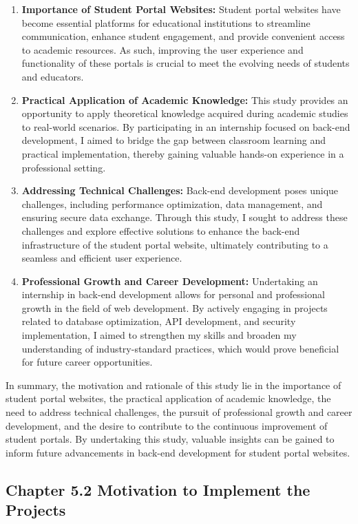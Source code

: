 \documentclass[12pt]{article}
\begin{document}
\begin{enumerate}
\item \textbf{Importance of Student Portal Websites: }Student portal websites have become essential platforms for educational institutions to streamline communication, enhance student engagement, and provide convenient access to academic resources. As such, improving the user experience and functionality of these portals is crucial to meet the evolving needs of students and educators.
\item \textbf{Practical Application of Academic Knowledge: }This study provides an opportunity to apply theoretical knowledge acquired during academic studies to real-world scenarios. By participating in an internship focused on back-end development, I aimed to bridge the gap between classroom learning and practical implementation, thereby gaining valuable hands-on experience in a professional setting.
\item \textbf{Addressing Technical Challenges: } Back-end development poses unique challenges, including performance optimization, data management, and ensuring secure data exchange. Through this study, I sought to address these challenges and explore effective solutions to enhance the back-end infrastructure of the student portal website, ultimately contributing to a seamless and efficient user experience.
\item \textbf{Professional Growth and Career Development: }Undertaking an internship in back-end development allows for personal and professional growth in the field of web development. By actively engaging in projects related to database optimization, API development, and security implementation, I aimed to strengthen my skills and broaden my understanding of industry-standard practices, which would prove beneficial for future career opportunities.
\end{enumerate}
\medskip
In summary, the motivation and rationale of this study lie in the importance of student portal websites, the practical application of academic knowledge, the need to address technical challenges, the pursuit of professional growth and career development, and the desire to contribute to the continuous improvement of student portals. By undertaking this study, valuable insights can be gained to inform future advancements in back-end development for student portal websites.
\vspace{1.5cm}
\begin{center}\subsection*{Chapter 5.2 Motivation to Implement the Projects}\end{center}
\end{document}
